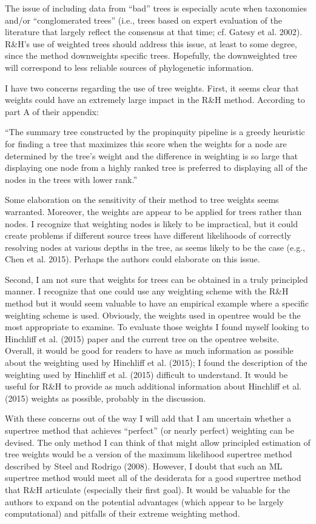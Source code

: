 \documentclass{article}
\begin{document}
The issue of including data from “bad” trees is especially acute when taxonomies and/or “conglomerated trees” (i.e., trees based on expert evaluation of the literature that largely reflect the consensus at that time; cf. Gatesy et al. 2002). R\&H’s use of weighted trees should address this issue, at least to some degree, since the method downweights specific trees. Hopefully, the downweighted tree will correspond to less reliable sources of phylogenetic information.

I have two concerns regarding the use of tree weights. First, it seems clear that weights could have an extremely large impact in the R\&H method. According to part A of their appendix:

“The summary tree constructed by the propinquity pipeline is a greedy heuristic for finding a tree that maximizes this score when the weights for a node are determined by the tree’s weight and the difference in weighting is so large that displaying one node from a highly ranked tree is preferred to displaying all of the nodes in the trees with lower rank.”

Some elaboration on the sensitivity of their method to tree weights seems warranted. Moreover, the weights are appear to be applied for trees rather than nodes. I recognize that weighting nodes is likely to be impractical, but it could create problems if different source trees have different likelihoods of correctly resolving nodes at various depths in the tree, as seems likely to be the case (e.g., Chen et al. 2015). Perhaps the authors could elaborate on this issue.

Second, I am not sure that weights for trees can be obtained in a truly principled manner. I recognize that one could use any weighting scheme with the R\&H method but it would seem valuable to have an empirical example where a specific weighting scheme is used. Obviously, the weights used in opentree would be the most appropriate to examine. To evaluate those weights I found myself looking to Hinchliff et al. (2015) paper and the current tree on the opentree website. Overall, it would be good for readers to have as much information as possible about the weighting used by Hinchliff et al. (2015); I found the description of the weighting used by Hinchliff et al. (2015) difficult to understand. It would be useful for R\&H to provide as much additional information about Hinchliff et al. (2015) weights as possible, probably in the discussion.

With these concerns out of the way I will add that I am uncertain whether a supertree method that achieves “perfect” (or nearly perfect) weighting can be devised. The only method I can think of that might allow principled estimation of tree weights would be a version of the maximum likelihood supertree method described by Steel and Rodrigo (2008). However, I doubt that such an ML supertree method would meet all of the desiderata for a good supertree method that R\&H articulate (especially their first goal). It would be valuable for the authors to expand on the potential advantages (which appear to be largely computational) and pitfalls of their extreme weighting method.
\end{document}
